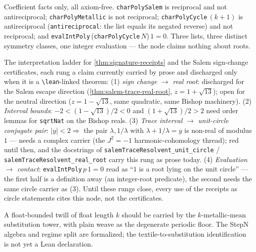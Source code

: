 \begin{theorem}\label{thm:signature-receipts}\leanok{}
Coefficient facts only, all axiom-free. \texttt{charPolySalem} is reciprocal
and not antireciprocal; \texttt{charPolyMetallic} is not reciprocal;
\texttt{charPolyCycle}\,$(k{+}1)$ is antireciprocal
(\texttt{antireciprocal}: the list equals its negated reverse) and not
reciprocal; and \texttt{evalIntPoly}\,(\texttt{charPolyCycle}\,$N$)\,$1 = 0$.
Three lists, three distinct symmetry classes, one integer evaluation --- the
node claims nothing about roots.
\end{theorem}

\begin{theorem}\label{thm:signature-receipts-reading}\notready{}
The interpretation ladder for \cref{thm:signature-receipts} and the Salem
sign-change certificates, each rung a claim currently carried by prose and
discharged only when it is a \texttt{\textbackslash lean}-linked theorem:
(1) \emph{sign change $\to$ real root}: discharged for the Salem escape
direction (\cref{thm:salem-trace-real-root}, $z = 1 + \sqrt{13}$); open for
the neutral direction ($z = 1 - \sqrt{13}$, same quadratic, same Bishop
machinery). (2) \emph{Interval bounds}: $-2 < (1-\sqrt{13})/2 < 0$ and
$(1+\sqrt{13})/2 > 2$ need order lemmas for \texttt{sqrtNat} on the Bishop
reals. (3) \emph{Trace interval $\to$ unit-circle conjugate pair}: $|y| < 2
\Rightarrow$ the pair $\lambda, 1/\lambda$ with $\lambda + 1/\lambda = y$
is non-real of modulus $1$ --- needs a complex carrier (the $J^2 = -1$
harmonic-cohomology thread); red until then, and the docstrings of
\texttt{salemTraceResolvent\_unit\_circle} /
\texttt{salemTraceResolvent\_real\_root} carry this rung as prose today.
(4) \emph{Evaluation $\to$ contact}: \texttt{evalIntPoly}\,$p\,1 = 0$ read
as ``$1$ is a root lying on the unit circle'' — the first half is a
definition away (an integer-root predicate), the second needs the same
circle carrier as (3). Until these rungs close, every use of the receipts
as circle statements cites this node, not the certificates.
\end{theorem}

\begin{theorem}\label{thm:weave-is-metallic}\notready{}
A float-bounded twill of float length \(k\) should be carried by the
\(k\)-metallic-mean substitution tower, with plain weave as the degenerate
periodic floor.  The StepN algebra and regime split are formalized; the
textile-to-substitution identification is not yet a Lean declaration.
\end{theorem}

